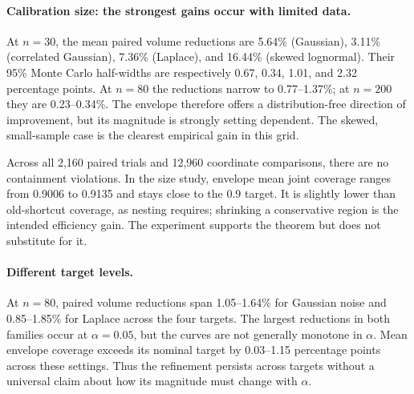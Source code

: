 \paragraph{Calibration size: the strongest gains occur with limited data.}
At $n=30$, the mean paired volume reductions are 5.64\% (Gaussian),
3.11\% (correlated Gaussian), 7.36\% (Laplace), and 16.44\% (skewed
lognormal). Their 95\% Monte Carlo half-widths are respectively 0.67,
0.34, 1.01, and 2.32 percentage points. At $n=80$ the reductions narrow
to 0.77--1.37\%; at $n=200$ they are 0.23--0.34\%.
The envelope therefore offers a distribution-free direction of improvement,
but its magnitude is strongly setting dependent. The skewed, small-sample
case is the clearest empirical gain in this grid.

Across all 2,160 paired trials and 12,960 coordinate comparisons, there are
no containment violations. In the size study, envelope mean joint coverage
ranges from 0.9006 to 0.9135 and stays close to the 0.9 target. It is slightly
lower than old-shortcut coverage, as nesting requires; shrinking a conservative
region is the intended efficiency gain. The experiment supports the theorem
but does not substitute for it.

\paragraph{Different target levels.}
At $n=80$, paired volume reductions span 1.05--1.64\% for Gaussian noise
and 0.85--1.85\% for Laplace across the four targets. The largest reductions
in both families occur at $\alpha=0.05$, but the curves are not generally
monotone in $\alpha$. Mean envelope coverage exceeds its nominal target by
0.03--1.15 percentage points across these settings. Thus the refinement
persists across targets without a universal claim about how its magnitude
must change with $\alpha$.
